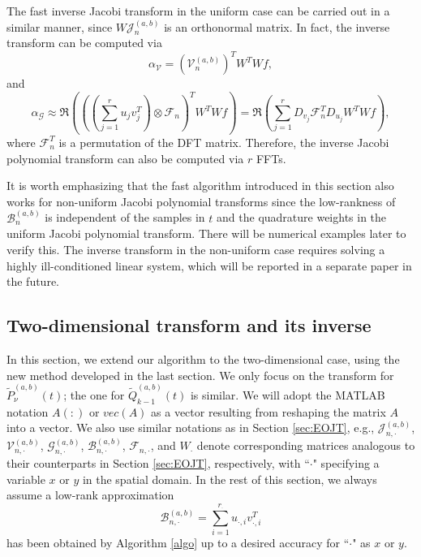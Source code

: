 \documentclass[11pt]{article}
\begin{document}
The fast inverse Jacobi transform in the uniform case can be carried out in a similar manner, since $W\mathcal{J}_{n}^{(a,b)}$ is an orthonormal matrix. In fact, the inverse transform can be computed via
\[
\alpha_{\mathcal{V}} = \left(\mathcal{V}_n^{(a,b)}\right)^T W^TWf,
\]
and
\begin{equation}
\label{eq:oneJinv}
\alpha_{\mathcal{G}}\approx \Re(((\sum\limits_{j=1}^{r}u_{j}v_{j}^T)\otimes \mathcal{F}_{n})^{T} W^{T}Wf) = \Re(\sum\limits_{j=1}^{r}D_{v_{j}}\mathcal{F}_{n}^{T}D_{u_{j}}W^{T}Wf),
\end{equation}
where $\mathcal{F}_{n}^{T}$ is a permutation of the DFT matrix. Therefore, the inverse Jacobi polynomial transform can also be computed via $r$ FFTs.



It is worth emphasizing that the fast algorithm introduced in this section also works for non-uniform Jacobi polynomial transforms since the low-rankness of $\mathcal{B}_{n}^{(a,b)}$ is independent of the samples in $t$ and the quadrature weights in the uniform Jacobi polynomial transform. There will be numerical examples later to verify this. The inverse transform in the non-uniform case requires solving a highly ill-conditioned linear system, which will be reported in a separate paper in the future.









\subsection{Two-dimensional transform and its inverse} 
\label{sec:DMJT}
In this section, we extend our algorithm to the two-dimensional case, using the new method developed in the last section. We only focus on the transform for $\tilde{P}_{\nu}^{(a,b)}(t)$; the one for $\tilde{Q}_{k-1}^{(a,b)}(t)$ is similar. {\color{blue}{And we concentrate on those transforms with a tensor-product structure.}} We will adopt the MATLAB notation $A(:)$ or $vec(A)$ as a vector resulting from reshaping the matrix $A$ into a vector. We also use similar notations as in Section \ref{sec:EOJT}, e.g., $\mathcal{J}_{n,\cdot}^{(a,b)}$, $\mathcal{V}_{n,\cdot}^{(a,b)}$, $\mathcal{G}_{n,\cdot}^{(a,b)}$, $\mathcal{B}_{n,\cdot}^{(a,b)}$, $\mathcal{F}_{n,\cdot}$, and $W_{\cdot}$ denote corresponding matrices analogous to their counterparts in Section \ref{sec:EOJT}, respectively, with ``$\cdot$" specifying a variable $x$ or $y$  in the spatial domain. In the rest of this section, we always assume a low-rank approximation 
\begin{equation}
\label{eqn:Blr}
\mathcal{B}_{n,\cdot}^{(a,b)} = \sum_{i=1}^{r_{\cdot}}u_{\cdot,i}v_{\cdot,i}^{T}
\end{equation}
has been obtained by Algorithm \ref{algo} up to a desired accuracy for ``$\cdot$" as $x$ or $y$. 
\end{document}
